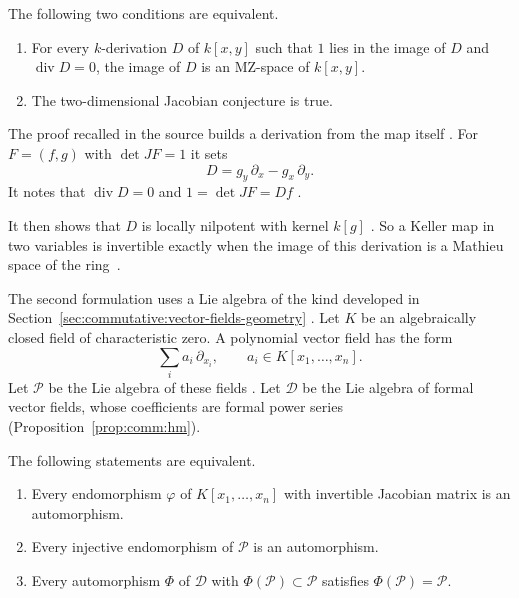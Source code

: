 \begin{proposition}\label{prop:comm:jc-div}
The following two conditions are equivalent.
\begin{enumerate}
\item For every $k$-derivation $D$ of $k[x,y]$ such that $1$ lies in the
image of $D$ and $\operatorname{div} D = 0$, the image of $D$ is an
MZ-space of $k[x,y]$.
\item The two-dimensional Jacobian conjecture is true.
\end{enumerate}
\end{proposition}

The proof recalled in the source builds a derivation from the map itself
\cite[pp.~130--131]{VanEssenKurodaKoenig2021}. For $F = (f, g)$ with
$\det JF = 1$ it sets
\[
  D = g_y\,\partial_x - g_x\,\partial_y .
\]
It notes that $\operatorname{div} D = 0$ and $1 = \det JF = Df$
\cite[pp.~130--131]{VanEssenKurodaKoenig2021}.

It then shows that $D$ is locally nilpotent with kernel $k[g]$
\cite[pp.~130--131]{VanEssenKurodaKoenig2021}. So a Keller map in two
variables is invertible exactly when the image of this derivation is a Mathieu
space of the ring~\cite[pp.~130--131]{VanEssenKurodaKoenig2021}.

The second formulation uses a Lie algebra of the kind developed in
Section~\ref{sec:commutative:vector-fields-geometry}
\cite[p.~211]{HauserMuller1998}. Let $K$ be an algebraically closed field of
characteristic zero. A polynomial vector field has the form
\[
  \sum_i a_i\,\partial_{x_i}, \qquad a_i \in K[x_1,\dots,x_n].
\]
Let $\mathcal{P}$ be the Lie algebra of these fields
\cite[p.~211]{HauserMuller1998}. Let $\mathcal{D}$ be the Lie algebra of formal
vector fields, whose coefficients are formal power
series~ (Proposition~\ref{prop:comm:hm})\cite[p.~211]{HauserMuller1998}.

\begin{proposition}\label{prop:comm:hm}
The following statements are equivalent.
\begin{enumerate}
\item Every endomorphism $\varphi$ of $K[x_1,\dots,x_n]$ with invertible
Jacobian matrix is an automorphism.
\item Every injective endomorphism of $\mathcal{P}$ is an automorphism.
\item Every automorphism $\Phi$ of $\mathcal{D}$ with
$\Phi(\mathcal{P}) \subset \mathcal{P}$ satisfies
$\Phi(\mathcal{P}) = \mathcal{P}$.
\end{enumerate}
\end{proposition}

